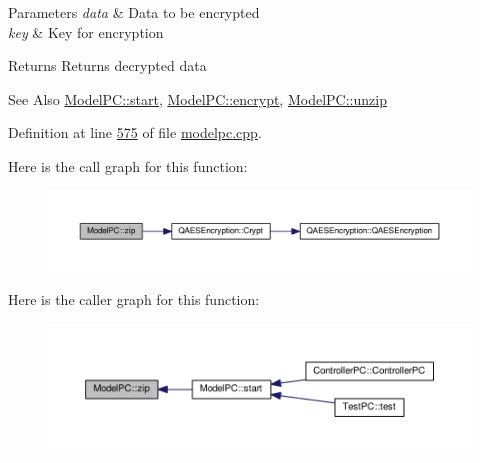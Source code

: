 \begin{DoxyParams}{Parameters}
{\em data} & Data to be encrypted \\
\hline
{\em key} & Key for encryption \\
\hline
\end{DoxyParams}
\begin{DoxyReturn}{Returns}
Returns decrypted data 
\end{DoxyReturn}
\begin{DoxySeeAlso}{See Also}
\hyperlink{class_model_p_c_a3cae34fd5bcb06e8c1f8cfe7961bd270}{Model\-P\-C\-::start}, \hyperlink{class_model_p_c_a48667f5b1a547d03a3def2d3db5a220f}{Model\-P\-C\-::encrypt}, \hyperlink{class_model_p_c_a6da88f166785a49f73b22c169f956fd0}{Model\-P\-C\-::unzip} 
\end{DoxySeeAlso}


Definition at line \hyperlink{modelpc_8cpp_source_l00575}{575} of file \hyperlink{modelpc_8cpp_source}{modelpc.\-cpp}.



Here is the call graph for this function\-:
\nopagebreak
\begin{figure}[H]
\begin{center}
\leavevmode
\includegraphics[width=350pt]{class_model_p_c_afebbbfa4b07deba4f68fc6dfb50f353f_cgraph}
\end{center}
\end{figure}




Here is the caller graph for this function\-:
\nopagebreak
\begin{figure}[H]
\begin{center}
\leavevmode
\includegraphics[width=350pt]{class_model_p_c_afebbbfa4b07deba4f68fc6dfb50f353f_icgraph}
\end{center}
\end{figure}




